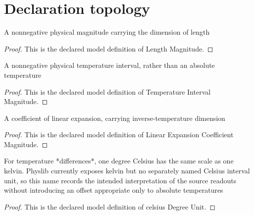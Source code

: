 \section{Declaration topology}
\begin{definition}
  \label{def:physics:phyx-mini-0154:phyxminiproblems-problemphyxmini0154-lengthmagnitude}
  A nonnegative physical magnitude carrying the dimension of length
\end{definition}
\begin{proof}
  This is the declared model definition of Length Magnitude.
\end{proof}
\begin{definition}
  \label{def:physics:phyx-mini-0154:phyxminiproblems-problemphyxmini0154-temperatureintervalmagnitude}
  A nonnegative physical temperature interval, rather than an absolute temperature
\end{definition}
\begin{proof}
  This is the declared model definition of Temperature Interval Magnitude.
\end{proof}
\begin{definition}
  \label{def:physics:phyx-mini-0154:phyxminiproblems-problemphyxmini0154-linearexpansioncoefficientmagnitude}
  A coefficient of linear expansion, carrying inverse-temperature dimension
\end{definition}
\begin{proof}
  This is the declared model definition of Linear Expansion Coefficient Magnitude.
\end{proof}
\begin{definition}
  \label{def:physics:phyx-mini-0154:phyxminiproblems-problemphyxmini0154-celsiusdegreeunit}
  For temperature *differences*, one degree Celsius has the same scale as one kelvin. Physlib currently exposes kelvin but no separately named Celsius interval unit, so this name records the intended interpretation of the source readouts without introducing an offset appropriate only to absolute temperatures
\end{definition}
\begin{proof}
  This is the declared model definition of celsius Degree Unit.
\end{proof}
